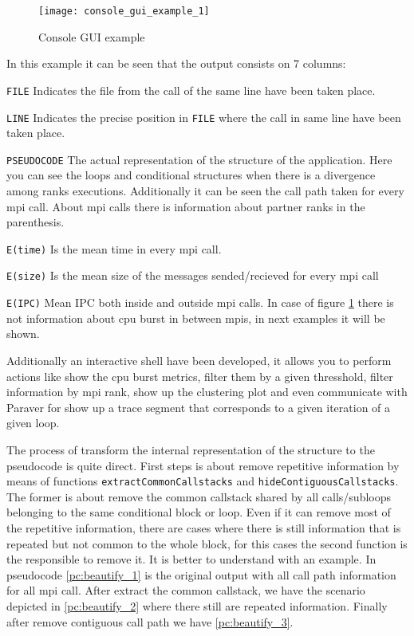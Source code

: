 \begin{figure}[]
  \centering
  \texttt{[image: console\_gui\_example\_1]}
  \caption{Console GUI example}
  \label{fig:console_gui_example_1}
\end{figure}

In this example it can be seen that the output consists on 7 columns: 
\begin{description}
  \item \texttt{FILE} Indicates the file from the call of the same line have
    been taken place.
  \item \texttt{LINE} Indicates the precise position in \texttt{FILE} where the
    call in same line have been taken place.
  \item \texttt{PSEUDOCODE} The actual representation of the structure of the
    application. Here you can see the loops and conditional structures when
    there is a divergence among ranks executions. Additionally it can be seen
    the call path taken for every mpi call. About mpi calls there is information
    about partner ranks in the parenthesis.
  \item \texttt{E(time)} Is the mean time in every mpi call.
  \item \texttt{E(size)} Is the mean size of the messages sended/recieved for
    every mpi call
  \item \texttt{E(IPC)} Mean IPC both inside and outside mpi calls. In case of
    figure \ref{fig:console_gui_example_1} there is not information about cpu
    burst in between mpis, in next examples it will be shown.
\end{description}

Additionally an interactive shell have been developed, it allows you to perform
actions like show the cpu burst metrics, filter them by a given thresshold,
filter information by mpi rank, show up the clustering plot and even communicate
with Paraver for show up a trace segment that corresponds to a given iteration
of a given loop. 

The process of transform the internal representation of the structure to the
pseudocode is quite direct. First steps is about remove repetitive information
by means of functions \texttt{extractCommonCallstacks} and
\texttt{hideContiguousCallstacks}. The former is about remove the common
callstack shared by all calls/subloops belonging to the same conditional block
or loop. Even if it can remove most of the repetitive information, there are
cases where there is still information that is repeated but not common to the
whole block, for this cases the second function is the responsible to remove it.
It is better to understand with an example. In pseudocode \ref{pc:beautify_1} is
the original output with all call path information for all mpi call. After
extract the common callstack, we have the scenario depicted in
\ref{pc:beautify_2} where there still are repeated information. Finally after
remove contiguous call path we have \ref{pc:beautify_3}.


